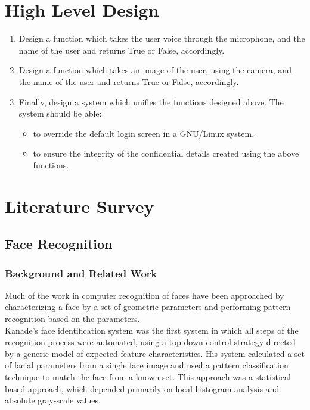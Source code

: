 \chapter{High Level Design}
\begin{enumerate}
  \item Design a function which takes the user voice through the microphone,
        and the name of the user and returns True or False, accordingly.
  \item Design a function which takes an image of the user, using the camera,
        and the name of the user and returns True or False, accordingly.
  \item Finally, design a system which unifies the functions designed above.
        The system should be able:
        \begin{itemize}
          \item to override the default login screen in a GNU/Linux system.
          \item to ensure the integrity of the confidential details created
                using the above functions.
        \end{itemize}
\end{enumerate}

\chapter{Literature Survey}

\section{Face Recognition}

\subsection{Background and Related Work}
Much of the work in computer recognition of faces have been approached by
characterizing a face by a set of geometric parameters and performing pattern
recognition based on the parameters. \\
Kanade's face identification system \cite{Kanade1973} was the first system in which all
steps of the recognition process were automated, using a top-down control strategy
directed by a generic model of expected feature characteristics. His system calculated
a set of facial parameters from a single face image and used a pattern classification
technique to match the face from a known set. This approach was a statistical
based approach, which depended primarily on local histogram analysis and absolute
gray-scale values. \\

